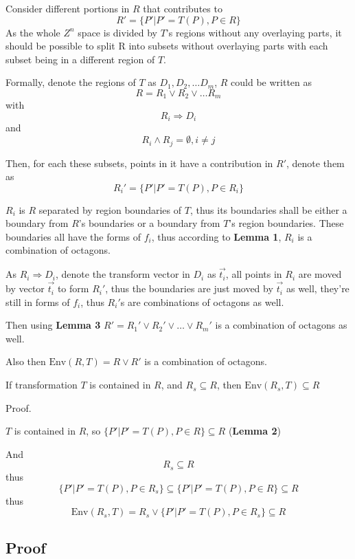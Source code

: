 \documentclass[letterpaper,]{article}
\providecommand{\tightlist}{%
  \setlength{\itemsep}{0pt}\setlength{\parskip}{0pt}}
\begin{document}
Consider different portions in \(R\) that contributes to
\[R' = \{P'| P' = T(P), P \in R\}\] As the whole \(Z^n\) space is
divided by \(T\)'s regions without any overlaying parts, it should be
possible to split R into subsets without overlaying parts with each
subset being in a different region of \(T\).

Formally, denote the regions of \(T\) as \(D_1, D_2, \dots D_m\), \(R\)
could be written as \[R = R_1 \lor R_2 \lor \dots R_m \] with
\[ R_i \Rightarrow D_i\] and \[ R_i \land R_j = \emptyset, i \neq j \]

Then, for each these subsets, points in it have a contribution in
\(R'\), denote them as \[R_i' = \{P'| P' = T(P), P \in R_i\}\]

\(R_i\) is \(R\) separated by region boundaries of \(T\), thus its
boundaries shall be either a boundary from \(R\)'s boundaries or a
boundary from \(T\)'s region boundaries. These boundaries all have the
forms of \(f_i\), thus according to \textbf{Lemma 1}, \(R_i\) is a
combination of octagons.

As \(R_i \Rightarrow D_i\), denote the transform vector in \(D_i\) as
\(\vec{t_i}\), all points in \(R_i\) are moved by vector \(\vec{t_i}\)
to form \(R_i'\), thus the boundaries are just moved by \(\vec{t_i}\) as
well, they're still in forms of \(f_i\), thus \(R_i'\)s are combinations
of octagons as well.

Then using \textbf{Lemma 3} \(R' = R_1' \lor R_2' \lor \dots \lor R_m'\)
is a combination of octagons as well.

Also then \(\mathrm{Env}(R, T) = R \lor R'\) is a combination of
octagons.

\begin{description}
\tightlist
\item[Lemma 5]
If transformation \(T\) is contained in \(R\), and \(R_s \subseteq R\),
then \(\mathrm{Env}(R_s, T) \subseteq R\)
\end{description}

Proof.

\(T\) is contained in \(R\), so \(\{P'|P' = T(P), P\in R\} \subseteq R\)
(\textbf{Lemma 2})

And \[R_s \subseteq R\] thus
\[\{P'|P' = T(P), P \in R_s\} \subseteq \{P'|P' = T(P), P \in R\} \subseteq R \]
thus \[ \mathrm{Env}(R_s, T) = R_s \lor
\{P'|P' = T(P), P \in R_s\} \subseteq R\]

\hypertarget{proof}{%
\subsection{Proof}\label{proof}}
\end{document}
